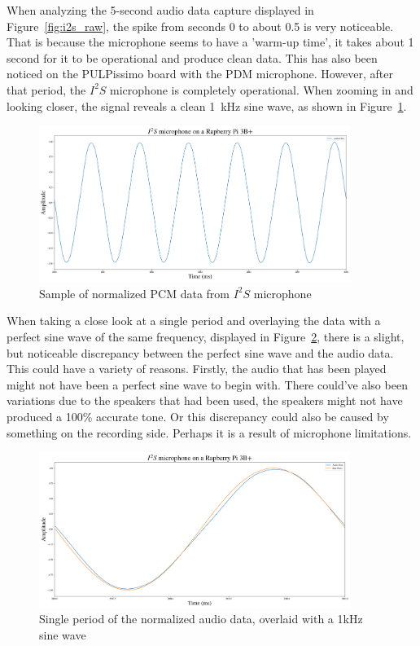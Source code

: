 When analyzing the 5-second audio data capture displayed in Figure~\ref{fig:i2s_raw}, the spike from seconds 0 to about 0.5
is very noticeable. That is because the microphone seems to have a 'warm-up time', it takes about 1 second for it to be operational and produce clean data.
This has also been noticed on the PULPissimo board with the PDM microphone.
However, after that period, the $I^2S$ microphone is completely operational.
When zooming in and looking closer, the signal reveals a clean \SI{1}{\kilo\hertz} sine wave, as shown in Figure~\ref{fig:i2s_section}.

\begin{figure}[H]
    \centering
    \includegraphics[width=0.9\textwidth]{figures/i2s/i2s_data_recording.png}
    \caption[Sample of normalized PCM data from $I^2S$ microphone]{Sample of normalized PCM data from $I^2S$ microphone}
    \label{fig:i2s_section}
\end{figure}

When taking a close look at a single period and overlaying the data with a perfect sine wave of the same
frequency, displayed in Figure~\ref{fig:i2s_period}, there is a slight, but noticeable discrepancy between the perfect sine
wave and the audio data.
This could have a variety of reasons.
Firstly, the audio that has been played might not have been a perfect sine wave to begin with.
There could've also been variations due to the speakers that had been used, the speakers
might not have produced a 100\% accurate tone.
Or this discrepancy could also be caused by something on the recording side.
Perhaps it is a result of microphone limitations.

\begin{figure}[H]
    \centering
    \includegraphics[width=0.9\textwidth]{figures/i2s/i2s_one_period.png}
    \caption[A single period of the normalized audio data, overlaid with a perfect 1kHz sine wave]{Single period of the normalized audio data, overlaid with a 1kHz sine wave}
    \label{fig:i2s_period}
\end{figure}

